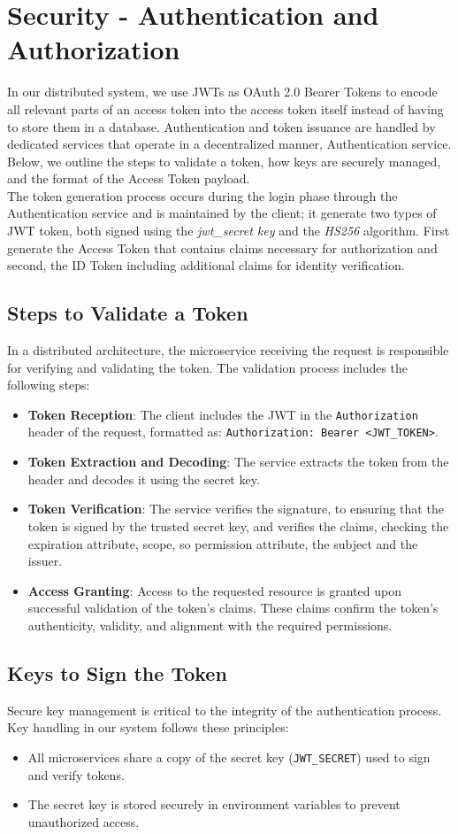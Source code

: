 \documentclass{article}
\begin{document}
\section{Security - Authentication and Authorization}
In our distributed system, we use JWTs as OAuth 2.0 Bearer Tokens to encode all relevant parts of an access token into the access token itself instead of having to store them in a database. Authentication and token issuance are handled by dedicated services that operate in a decentralized manner, Authentication service. Below, we outline the steps to validate a token, how keys are securely managed, and the format of the Access Token payload. \\
The token generation process occurs during the login phase through the Authentication service and is maintained by the client; it generate two types of JWT token, both signed using the \emph{jwt\_secret key} and the \emph{HS256} algorithm. First generate the Access Token that contains claims necessary for authorization and second, the ID Token including additional claims for identity verification.
\subsection{Steps to Validate a Token}
In a distributed architecture, the microservice receiving the request is responsible for verifying and validating the token. The validation process includes the following steps:
\begin{itemize}
    \item \textbf{Token Reception}: The client includes the JWT in the \texttt{Authorization} header of the request, formatted as: \texttt{Authorization: Bearer <JWT\_TOKEN>}.
    \item \textbf{Token Extraction and Decoding}: The service extracts the token from the header and decodes it using the secret key.
    \item \textbf{Token Verification}: The service verifies the signature, to ensuring that the token is signed by the trusted secret key, and verifies the claims, checking the expiration attribute, scope, so permission attribute, the subject and the issuer.
    \item \textbf{Access Granting}: Access to the requested resource is granted upon successful validation of the token's claims. These claims confirm the token's authenticity, validity, and alignment with the required permissions.
\end{itemize}

\subsection{Keys to Sign the Token}
 Secure key management is critical to the integrity of the authentication process. Key handling in our system follows these principles: 
 \begin{itemize} 
    \item All microservices share a copy of the secret key (\texttt{JWT\_SECRET}) used to sign and verify tokens. 
    \item The secret key is stored securely in environment variables to prevent unauthorized access. 
 \end{itemize}
\end{document}
